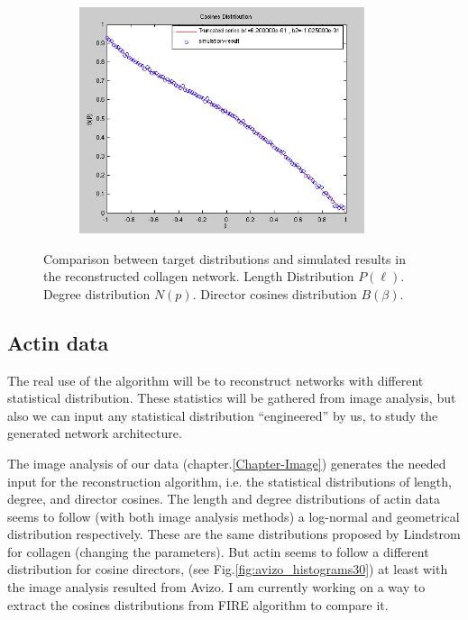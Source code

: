 \begin{figure}[h!]
\begin{subfigure}{0.32\textwidth}
    \includegraphics[width=0.92\textwidth]{Figures/chapter-reconstruct/cosinesN10000.png}%
    \label{collagen_cosines}
  \end{subfigure}

\caption[Collagen: comparing target and simulated distributions]{ Comparison
between target distributions and simulated results in the reconstructed collagen
network.
 Length Distribution $P(\ell)$.
 Degree distribution $N(p)$.
 Director cosines distribution $B(\beta)$.
}
\label{fig:collagen-distributions}
\end{figure}

\subsection{Actin data}
The real use of the algorithm will be to reconstruct networks with different
statistical distribution. These statistics will be gathered from image analysis,
but also we can input any statistical distribution ``engineered'' by us, to
study the generated network architecture.

The image analysis of our data (chapter.\ref{Chapter-Image}) generates the
needed input for the reconstruction algorithm, i.e. the statistical
distributions of length, degree, and director cosines.
The length and degree distributions of actin data seems to follow (with both
image analysis methods) a log-normal and geometrical distribution respectively.
These are the same distributions proposed by Lindstrom for collagen (changing the parameters). But actin seems to
follow a different distribution for cosine directors, (see
Fig.\ref{fig:avizo_histograms30}) at least with the image analysis resulted from
Avizo.  I am currently working on a way to extract the cosines distributions
from FIRE algorithm to compare it.

